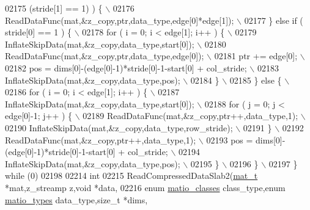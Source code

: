 \begin{DoxyCode}
{{{{{{{{{02175 \textcolor{preprocessor}{             (stride[1] == 1) ) \{ \(\backslash\)}
02176 \textcolor{preprocessor}{            ReadDataFunc(mat,&z\_copy,ptr,data\_type,edge[0]*edge[1]); \(\backslash\)}
02177 \textcolor{preprocessor}{        \} else if ( stride[0] == 1 ) \{ \(\backslash\)}
02178 \textcolor{preprocessor}{            for ( i = 0; i < edge[1]; i++ ) \{ \(\backslash\)}
02179 \textcolor{preprocessor}{                InflateSkipData(mat,&z\_copy,data\_type,start[0]); \(\backslash\)}
02180 \textcolor{preprocessor}{                ReadDataFunc(mat,&z\_copy,ptr,data\_type,edge[0]); \(\backslash\)}
02181 \textcolor{preprocessor}{                ptr += edge[0]; \(\backslash\)}
02182 \textcolor{preprocessor}{                pos = dims[0]-(edge[0]-1)*stride[0]-1-start[0] + col\_stride; \(\backslash\)}
02183 \textcolor{preprocessor}{                InflateSkipData(mat,&z\_copy,data\_type,pos); \(\backslash\)}
02184 \textcolor{preprocessor}{            \} \(\backslash\)}
02185 \textcolor{preprocessor}{        \} else \{ \(\backslash\)}
02186 \textcolor{preprocessor}{            for ( i = 0; i < edge[1]; i++ ) \{ \(\backslash\)}
02187 \textcolor{preprocessor}{                InflateSkipData(mat,&z\_copy,data\_type,start[0]); \(\backslash\)}
02188 \textcolor{preprocessor}{                for ( j = 0; j < edge[0]-1; j++ ) \{ \(\backslash\)}
02189 \textcolor{preprocessor}{                    ReadDataFunc(mat,&z\_copy,ptr++,data\_type,1); \(\backslash\)}
02190 \textcolor{preprocessor}{                    InflateSkipData(mat,&z\_copy,data\_type,row\_stride); \(\backslash\)}
02191 \textcolor{preprocessor}{                \} \(\backslash\)}
02192 \textcolor{preprocessor}{                ReadDataFunc(mat,&z\_copy,ptr++,data\_type,1); \(\backslash\)}
02193 \textcolor{preprocessor}{                pos = dims[0]-(edge[0]-1)*stride[0]-1-start[0] + col\_stride; \(\backslash\)}
02194 \textcolor{preprocessor}{                InflateSkipData(mat,&z\_copy,data\_type,pos); \(\backslash\)}
02195 \textcolor{preprocessor}{            \} \(\backslash\)}
02196 \textcolor{preprocessor}{        \} \(\backslash\)}
02197 \textcolor{preprocessor}{    \} while (0)}
02198 
02214 \textcolor{keywordtype}{int}
02215 ReadCompressedDataSlab2(\hyperlink{struct__mat__t}{mat\_t} *mat,z\_streamp z,\textcolor{keywordtype}{void} *data,
02216     \textcolor{keyword}{enum} \hyperlink{group___m_a_t_gad4d60ae7b709fc81bfd744fb4c857c40}{matio\_classes} class\_type,\textcolor{keyword}{enum} \hyperlink{group___m_a_t_gacf7b3b879282b7ab3a51190e49bf3453}{matio\_types} data\_type,\textcolor{keywordtype}{size\_t} *dims,
}}}}}}}}}
\end{DoxyCode}
